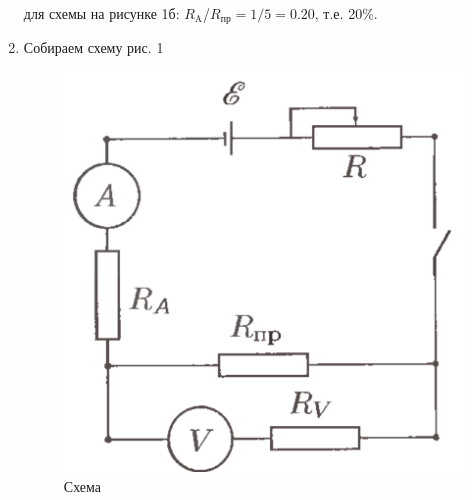 \documentclass[a4paper, 10pt]{article}%
\begin{document}
\begin{enumerate}
для схемы на рисунке 1б: $R_{\text{A}}$/$R_{\text{пр}} = 1/5 = 0.20$, т.е. 20\%.

\item Собираем схему рис. 1 \\
\begin{figure}[h]
\caption{Схема}
\centering
\includegraphics[scale=0.2]{sxema}
\end{figure}


\end{enumerate}
\end{document}
